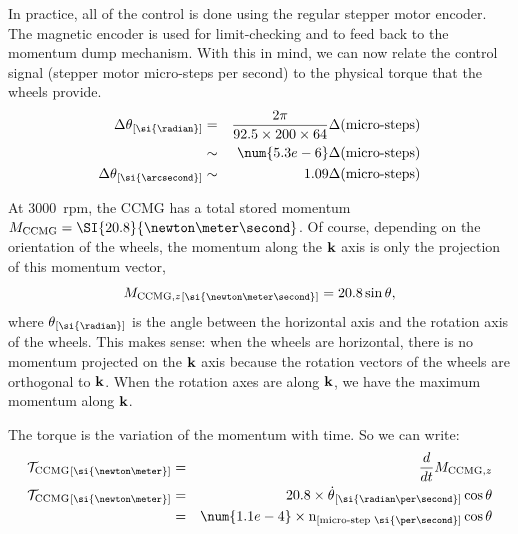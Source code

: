 In practice, all of the control is done using the regular stepper motor encoder. The magnetic encoder is used for limit-checking and to feed back to the momentum dump mechanism. With this in mind, we can now relate the control signal (stepper motor micro-steps per second) to the physical torque that the wheels provide. 
\begin{eqnarray}
\Delta\theta\units{\si{\radian}} &= &\frac{2\pi}{92.5\times 200\times 64}\Delta(\textrm{micro-steps}) \\ 
& \sim & \num{5.3e-6} \Delta(\textrm{micro-steps})\\
\Delta\theta\units{\si{\arcsecond}} &\sim &  1.09 \Delta(\textrm{micro-steps})
\end{eqnarray}

At \num{3000}~rpm, the CCMG has a total stored momentum $\MCCMG= \SI{20.8}{\newton\meter\second}$. Of course, depending on the orientation of the wheels, the momentum along the $\textrm{\textbf{k}}$ axis is only the projection of this momentum vector,
\begin{equation}
\MCCMGz\units{\si{\newton\meter\second}} = 20.8\sin\theta,
\end{equation}
where $\theta\units{\si{\radian}}$ is the angle between the horizontal axis and the rotation axis of the wheels. This makes sense: when the wheels are horizontal, there is no momentum projected on the $\textrm{\textbf{k}}$ axis because the rotation vectors of the wheels are orthogonal to $\textrm{\textbf{k}}$. When the rotation axes are along $\textrm{\textbf{k}}$, we have the maximum momentum along $\textrm{\textbf{k}}$. 

The torque is the variation of the momentum with time. So we can write:
\begin{eqnarray}
\ccmgtorque\units{\si{\newton\meter}} &= &\frac{d}{dt}\MCCMGz\\
\ccmgtorque\units{\si{\newton\meter}} &= & 20.8\times \dot{\theta}\units{\si{\radian\per\second}} \cos\theta\\
 &= & \num{1.1e-4}\times \velstepper\units{micro-step~\si{\per\second}}\cos\theta
\end{eqnarray}

\begin{figure}[!ht]
	\centering
	
	\caption{}
	\label{fig:CCMGnocase}
    \end{figure}

